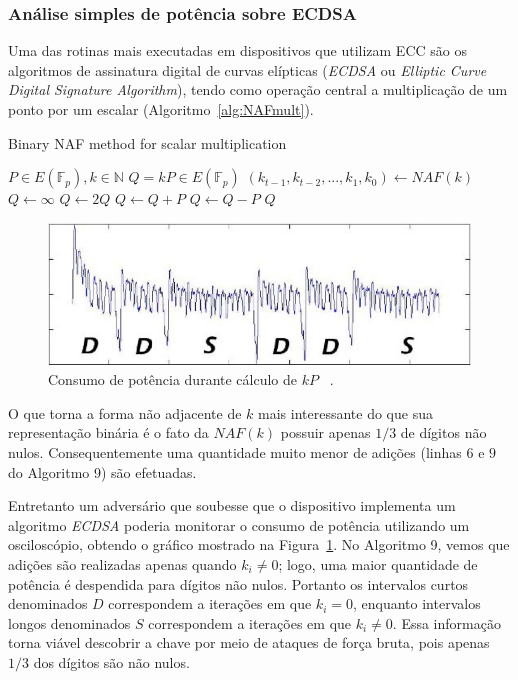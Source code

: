 \documentclass{SBCbookchapter}
\begin{document}
\subsubsection{An\'{a}lise simples de pot\^{e}ncia sobre ECDSA}
Uma das rotinas mais executadas em dispositivos que utilizam ECC s\~{a}o os algoritmos de assinatura digital de curvas el\'{i}pticas (\textit{ECDSA} ou \textit{Elliptic Curve Digital Signature Algorithm}), tendo como opera\c{c}\~{a}o central a multiplica\c{c}\~{a}o de um ponto por um escalar (Algoritmo~\ref{alg:NAFmult}).

\begin{algorithm}[H]
\caption{Binary NAF method for scalar multiplication}
\begin{algorithmic}[1]
    \REQUIRE $P \in E(\mathbb{F}_p), k \in \mathbb{N}$
    \ENSURE $Q = kP \in E(\mathbb{F}_p)$
    \STATE $(k_{t-1}, k_{t-2}, ..., k_{1}, k_{0}) \leftarrow NAF(k)$
    \STATE $Q \leftarrow \infty$
        \STATE $Q \leftarrow 2Q$
            \STATE $Q \leftarrow Q + P$
        \ENDIF
            \STATE $Q \leftarrow Q - P$
        \ENDIF
    \ENDFOR
    \RETURN $Q$
    \end{algorithmic}
\label{alg:NAFmult}
\end{algorithm}

\begin{figure}[ht]
	\centering
	\includegraphics[width=.8\textwidth]{figures/spa1.jpg}
	\caption{Consumo de pot\^{e}ncia durante c\'{a}lculo de $kP$~ \cite{ECCBook_HankersonVanstone2004}.}
	\label{fig:Fig5}
\end{figure}

O que torna a forma n\~{a}o adjacente de $k$ mais interessante do que sua representa\c{c}\~{a}o bin\'{a}ria \'{e} o fato da $NAF(k)$ possuir apenas $1/3$ de d\'{i}gitos n\~{a}o nulos. Conseq{u}entemente uma quantidade muito menor de adi\c{c}\~{o}es (linhas $6$ e $9$ do Algoritmo 9) s\~{a}o efetuadas.

Entretanto um advers\'{a}rio que soubesse que o dispositivo implementa um algoritmo \textit{ECDSA} poderia monitorar o consumo de pot\^{e}ncia utilizando um oscilosc\'{o}pio, obtendo o gr\'{a}fico mostrado na Figura~\ref{fig:Fig5}. No Algoritmo 9, vemos que adi\c{c}\~{o}es s\~{a}o realizadas apenas quando $k_{i} \neq 0$; logo, uma maior quantidade de pot\^{e}ncia \'{e} despendida para d\'{i}gitos n\~{a}o nulos. Portanto os intervalos curtos denominados $D$ correspondem a itera\c{c}\~{o}es em que $k_{i} = 0$, enquanto intervalos longos denominados $S$ correspondem a itera\c{c}\~{o}es em que $k_{i} \neq 0$. Essa informa\c{c}\~{a}o torna vi\'{a}vel descobrir a chave por meio de ataques de for\c{c}a bruta, pois apenas $1/3$ dos d\'{i}gitos s\~{a}o n\~{a}o nulos.
\end{document}
